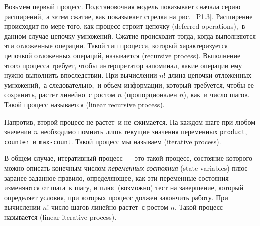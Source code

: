 Возьмем первый процесс.  Подстановочная модель
показывает сначала серию расширений,~а затем сжатие, как 
показывает стрелка на рис.~\ref{P1.3}.  Расширение
происходит по мере того, как процесс строит цепочку 
 (deferred operations),~в данном
случае цепочку умножений.  Сжатие происходит тогда, когда выполняются 
эти отложенные операции.  Такой тип процесса, который характеризуется
цепочкой отложенных операций, называется
(recursive process).  Выполнение этого
процесса требует, чтобы интерпретатор запоминал, какие операции ему
нужно выполнить впоследствии.  При вычислении $n!$ длина
цепочки отложенных умножений,~а следовательно,~и объем информации,
который требуется, чтобы ее сохранить, растет
линейно~с ростом
$n$ (пропорционален $n$), как~и число шагов.
Такой процесс называется  (linear recursive process).

Напротив, второй процесс не растет~и не сжимается.
На каждом шаге при любом значении $n$ необходимо помнить 
лишь текущие значения переменных {\tt pro\-duct},
{\tt counter}~и {\tt max-count}. Такой процесс мы
называем 
 (iterative        process).

В общем случае, итеративный процесс --- это такой процесс, состояние
которого можно описать конечным числом {\em переменных состояния} (state variables) плюс заранее заданное правило,
определяющее, как эти переменные состояния изменяются от шага~к шагу, и
плюс (возможно) тест на завершение, который определяет условия, при
которых процесс должен закончить работу.  При вычислении
$n!$ число шагов линейно растет~с ростом
$n$. Такой процесс называется 
%
%
%
 (linear iterative process).

